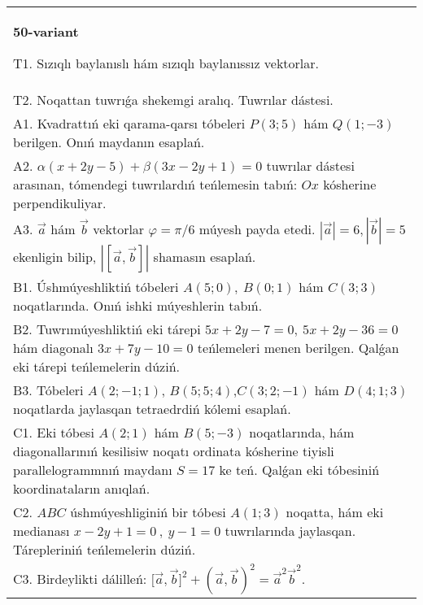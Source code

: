 \documentclass{article}
\begin{document}
\begin{tabular}{m{17cm}}
\textbf{50-variant}
\newline

T1. 
Sızıqlı baylanıslı hám sızıqlı baylanıssız vektorlar.
 \\
T2. 
Noqattan tuwrıǵa shekemgi aralıq. Tuwrılar dástesi.
 \\
A1. 
Kvadrattıń eki qarama-qarsı tóbeleri $P(3; 5)$ hám
$Q(1; -3)$ berilgen. Onıń maydanın esaplań.
 \\
A2. 
$\alpha(x+2y-5)+\beta(3x-2y+1)=0$ tuwrılar
dástesi arasınan, tómendegi tuwrılardıń teńlemesin tabıń:
$Ox$ kósherine perpendikuliyar.
 \\
A3. 
$\overrightarrow{a}$ hám $\overrightarrow{b}$ vektorlar
$\varphi = \pi/6$ múyesh payda etedi.
$|\overrightarrow{a}| = 6,|\overrightarrow{b}| = 5$ ekenligin bilip,
$\left| \left\lbrack \overrightarrow{a},\overrightarrow{b} \right\rbrack \right|$ shamasın esaplań. 
 \\
B1. 
Úshmúyeshliktiń tóbeleri \(A(5;0),\ B(0;1)\) hám \(C(3;3)\)
noqatlarında. Onıń ishki múyeshlerin tabıń.
 \\
B2. 
Tuwrımúyeshliktiń eki tárepi
\(5x+2y-7=0,\ 5x+2y-36=0\) hám diagonalı
\(3x+7y-10=0\) teńlemeleri menen berilgen. Qalǵan eki tárepi
teńlemelerin dúziń.
 \\
B3. 
Tóbeleri $A (2;-1;1)$, $B (5;5;4)$,$C (3;2;-1)$ hám $D (4;1;3)$ noqatlarda jaylasqan tetraedrdiń kólemi esaplań. \\
C1. 
Eki tóbesi \(A(2;1)\) hám \(B(5; - 3)\) noqatlarında, hám
diagonallarınıń kesilisiw noqatı ordinata kósherine tiyisli
parallelogrammnıń maydanı \(S = 17\) ke teń. Qalǵan eki tóbesiniń
koordinataların anıqlań. \\
C2. 
$ABC$ úshmúyeshliginiń bir tóbesi \(A(1;3)\) noqatta,
hám eki medianası \(x - 2y + 1 = 0\ ,\ y - 1 = 0\) tuwrılarında
jaylasqan. Tárepleriniń teńlemelerin dúziń.
 \\
C3. 
Birdeylikti dálilleń: \(\lbrack\vec{a},\vec{b}\rbrack^{2} + (\vec{a},\vec{b}) ^{2} = {\vec{a}}^{2}{\vec{b}}^{2}\).
 \\

\end{tabular}
\vspace{1cm}
\end{document}
